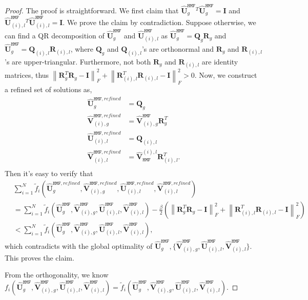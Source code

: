 \documentclass[twoside,11pt]{article}
\def\hmf{\texttt{HMF}\xspace}
\newcommand{\norm}[1]{\left\lVert#1\right\rVert}
\newcommand{\matI}{\mathbf{I}}
\newcommand{\matQ}{\mathbf{Q}}
\newcommand{\matR}{\mathbf{R}}
\newcommand{\hmatU}{\hat{\mathbf{U}}}
\newcommand{\hmatV}{\hat{\mathbf{V}}}
\newcommand{\tf}{\tilde{f}}
\begin{document}
\begin{proof}
The proof is straightforward. We first claim that $\hmatU_g^{\hmf}{}^T\hmatU_g^{\hmf}=\matI$ and $\hmatU^{\hmf}_{(i),l}{}^T\hmatU^{\hmf}_{(i),l}=\matI$. We prove the claim by contradiction. Suppose otherwise, we can find a QR decomposition of $\hmatU_g^{\hmf}$ and $\hmatU^{\hmf}_{(i),l}$ as $\hmatU_g^{\hmf} = \matQ_g\matR_g$ and $\hmatU_g^{\hmf} = \matQ_{(i),l}\matR_{(i),l}$, where $\matQ_g$ and $\matQ_{(i),l}$'s are orthonormal and $\matR_g$ and $\matR_{(i),l}$'s are upper-triangular. Furthermore, not both $\matR_g$ and $\matR_{(i),l}$ are identity matrices, thus $\norm{\matR_g^T\matR_g-\matI}_F^2+ \norm{\matR_{(i),l}^T\matR_{(i),l}-\matI}_F^2> 0$. Now, we construct a refined set of solutions as,
\begin{equation*}
\begin{aligned}
\hmatU_g^{\hmf, refined} &= \matQ_g\\
\hmatV^{\hmf, refined}_{(i),g} &= \hmatV_{(i),g}^{\hmf} \matR_g^{T}\\
\hmatU^{\hmf, refined}_{(i),l} &= \matQ_{(i),l}\\
\hmatV^{\hmf, refined}_{(i),l} &= \hmatV^{(i),l}_{\hmf} \matR_{(i),l}^{T}.\\
\end{aligned}
\end{equation*}
Then it's easy to verify that
$$
\begin{aligned}
&\sum_{i=1}^N\tf_i\left(\hmatU^{\hmf, refined}_g,\hmatV^{\hmf, refined}_{(i),g},\hmatU^{\hmf, refined}_{(i),l},\hmatV^{\hmf, refined}_{(i),l}\right)\\
&= \sum_{i=1}^N\tf_i\left(\hmatU^{\hmf}_g,\hmatV_{(i),g}^{\hmf},\hmatU^{\hmf}_{(i),l},\hmatV^{\hmf}_{(i),l}\right) - \frac{\beta}{2}\left(\norm{\matR_g^T\matR_g-\matI}_F^2+ \norm{\matR_{(i),l}^T\matR_{(i),l}-\matI}_F^2\right)\\
&< \sum_{i=1}^N\tf_i\left(\hmatU^{\hmf}_g,\hmatV_{(i),g}^{\hmf},\hmatU^{\hmf}_{(i),l},\hmatV^{\hmf}_{(i),l}\right),
\end{aligned}
$$
which contradicts with the global optimality of $\hmatU_g^{\hmf},\{\hmatV^{\hmf}_{(i),g},\hmatU^{\hmf}_{(i),l},\hmatV^{\hmf}_{(i),l}\}$. This proves the claim.

From the orthogonality, we know $f_i\left(\hmatU^{\hmf}_g,\hmatV_{(i),g}^{\hmf},\hmatU^{\hmf}_{(i),l},\hmatV^{\hmf}_{(i),l}\right) = \tf_i\left(\hmatU^{\hmf}_g,\hmatV_{(i),g}^{\hmf},\hmatU^{\hmf}_{(i),l},\hmatV^{\hmf}_{(i),l}\right)$.


\end{proof}
\end{document}
